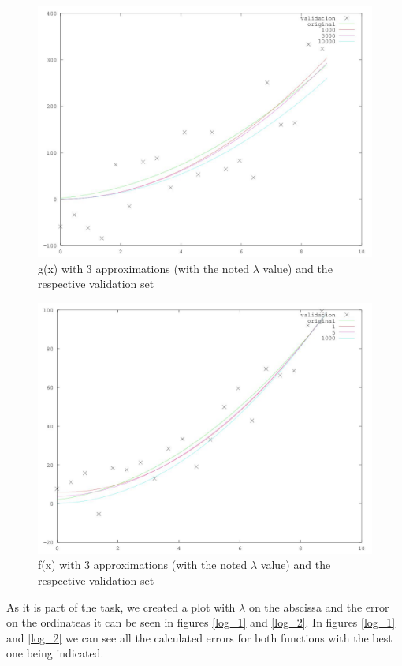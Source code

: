 \documentclass[12pt]{article}
\begin{document}
	\begin{figure}
		\centering
		\includegraphics[scale=0.5]{plot}
		\caption{g(x) with 3 approximations (with the noted $\lambda$ value) and the respective validation set}
		\label{fig:small_g_plot}
	\end{figure}

	\begin{figure}
		\centering
		\includegraphics[scale=0.5]{small_f_plot}
		\caption{f(x) with 3 approximations (with the noted $\lambda$ value) and the respective validation set}
		\label{fig:small_f_plot}
	\end{figure}
 
As it is part of the task, we created a plot with $\lambda$ on the abscissa and the error on the ordinateas it can be seen in figures \ref{log_1} and \ref{log_2}. 
In figures \ref{log_1} and \ref{log_2} we can see all the calculated errors for both functions with the best one being indicated.
\end{document}
